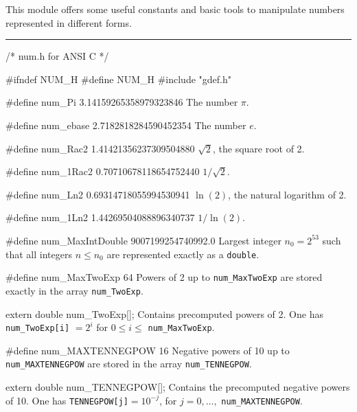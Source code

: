 
This module offers some useful constants and basic tools to 
manipulate numbers represented in different forms.

\bigskip\hrule
\code\hide
/* num.h for ANSI C */

#ifndef NUM_H
#define NUM_H
\endhide
#include "gdef.h"
\endcode

\code

#define num_Pi     3.14159265358979323846
\endcode
  \tab The number $\pi$.
  \endtab
\code

#define num_ebase  2.7182818284590452354
\endcode
  \tab The number $e$.
  \endtab
\code

#define num_Rac2   1.41421356237309504880
\endcode
  \tab $\sqrt{2}$, the square root of 2.
  \endtab
\code

#define num_1Rac2  0.70710678118654752440
\endcode
  \tab $1/\sqrt{2}$.
  \endtab
\code

#define num_Ln2    0.69314718055994530941
\endcode
  \tab $\ln(2)$, the natural logarithm of 2.
  \endtab
\code

#define num_1Ln2   1.44269504088896340737
\endcode
  \tab $1 / \ln(2)$.
  \endtab
\code

#define num_MaxIntDouble   9007199254740992.0
\endcode
  \tab Largest integer $n_0 = 2^{53}$ such that all integers
  $n \le n_0$ are represented  exactly as a {\tt double}.
  \endtab


\code

#define num_MaxTwoExp   64
\endcode
  \tab Powers of 2 up to {\tt num\_MaxTwoExp} are stored exactly 
  in the array {\tt num\_TwoExp}.
  \endtab
\code

extern double num_TwoExp[];   
\endcode
  \tab  Contains precomputed powers of 2.
  One has {\tt num\_TwoExp[i]} $= 2^i$ for $0 \le i \le$ 
  {\tt num\_MaxTwoExp}.
\endtab
\code

#define num_MAXTENNEGPOW   16
\endcode
  \tab Negative powers of 10 up to {\tt num\_MAXTENNEGPOW} are stored
  in the array {\tt num\_TENNEGPOW}.
  \endtab
\code

extern double num_TENNEGPOW[];
\endcode
 \tab Contains the precomputed negative powers of 10.
   One has {\tt TENNEGPOW[j]}$ = 10^{-j}$, for $j=0,\ldots,$
 {\tt num\_MAXTENNEGPOW}.
\endtab


\code

